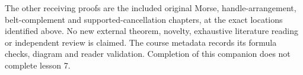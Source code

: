 The other receiving proofs are the included original Morse, handle-arrangement, belt-complement and supported-cancellation chapters, at the exact locations identified above. No new external theorem, novelty, exhaustive literature reading or independent review is claimed. The course metadata records its formula checks, diagram and reader validation. Completion of this companion does not complete lesson 7.
